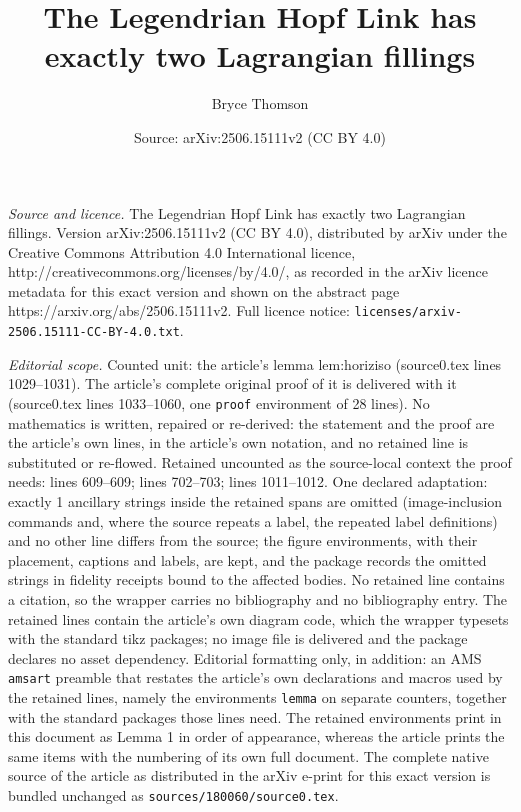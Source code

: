 \documentclass[10pt,a4paper]{amsart}
\title{The Legendrian Hopf Link has exactly two Lagrangian fillings}
\author{Bryce Thomson}
\date{Source: arXiv:2506.15111v2 (CC BY 4.0)}
\begin{document}
\maketitle

\noindent\emph{Source and licence.} The Legendrian Hopf Link has exactly two Lagrangian fillings. Version arXiv:2506.15111v2 (CC BY 4.0), distributed by arXiv under the Creative Commons Attribution 4.0 International licence, http://creativecommons.org/licenses/by/4.0/, as recorded in the arXiv licence metadata for this exact version and shown on the abstract page https://arxiv.org/abs/2506.15111v2. Full licence notice: \texttt{licenses/arxiv-2506.15111-CC-BY-4.0.txt}.\par\smallskip

\noindent\textit{Editorial scope.} Counted unit: the article's lemma lem:horiziso (source0.tex lines 1029--1031). The article's complete original proof of it is delivered with it (source0.tex lines 1033--1060, one \texttt{proof} environment of 28 lines). No mathematics is written, repaired or re-derived: the statement and the proof are the article's own lines, in the article's own notation, and no retained line is substituted or re-flowed.  Retained uncounted as the source-local context the proof needs: lines 609--609; lines 702--703; lines 1011--1012.  One declared adaptation: exactly 1 ancillary strings inside the retained spans are omitted (image-inclusion commands and, where the source repeats a label, the repeated label definitions) and no other line differs from the source; the figure environments, with their placement, captions and labels, are kept, and the package records the omitted strings in fidelity receipts bound to the affected bodies.  No retained line contains a citation, so the wrapper carries no bibliography and no bibliography entry.  The retained lines contain the article's own diagram code, which the wrapper typesets with the standard tikz packages; no image file is delivered and the package declares no asset dependency.  Editorial formatting only, in addition: an AMS \texttt{amsart} preamble that restates the article's own declarations and macros used by the retained lines, namely the environments \texttt{lemma} on separate counters, together with the standard packages those lines need.  The retained environments print in this document as Lemma 1 in order of appearance, whereas the article prints the same items with the numbering of its own full document.  The complete native source of the article as distributed in the arXiv e-print for this exact version is bundled unchanged as \texttt{sources/180060/source0.tex}.
\end{document}
